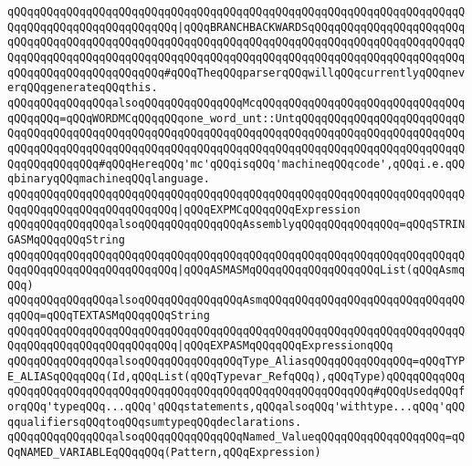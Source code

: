 \verb|qQQqqQQqqQQqqQQqqQQqqQQqqQQqqQQqqQQqqQQqqQQqqQQqqQQqqQQqqQQqqQQqqQQqqQQqqQQqqQQqqQQqqQQqqQQqqQQq|\verb#|qQQqBRANCHBACKWARDSqQQqqQQqqQQqqQQqqQQqqQQqqQQqqQQqqQQqqQQqqQQqqQQqqQQqqQQqqQQqqQQqqQQqqQQqqQQqqQQqqQQqqQQqqQQqqQQqqQQqqQQqqQQqqQQqqQQqqQQqqQQqqQQqqQQqqQQqqQQqqQQqqQQqqQQqqQQqqQQqqQQqqQQqqQQqqQQqqQQqqQQqqQQq#\verb|#qQQqTheqQQqparserqQQqwillqQQqcurrentlyqQQqneverqQQqgenerateqQQqthis.|\newline
\newline
\verb|qQQqqQQqqQQqqQQqalsoqQQqqQQqqQQqqQQqMcqQQqqQQqqQQqqQQqqQQqqQQqqQQqqQQqqQQqqQQq=qQQqWORDMCqQQqqQQqone_word_unt::UntqQQqqQQqqQQqqQQqqQQqqQQqqQQqqQQqqQQqqQQqqQQqqQQqqQQqqQQqqQQqqQQqqQQqqQQqqQQqqQQqqQQqqQQqqQQqqQQqqQQqqQQqqQQqqQQqqQQqqQQqqQQqqQQqqQQqqQQqqQQqqQQqqQQqqQQqqQQqqQQqqQQqqQQqqQQqqQQqqQQq#qQQqHereqQQq'mc'qQQqisqQQq'machineqQQqcode',qQQqi.e.qQQqbinaryqQQqmachineqQQqlanguage.|\newline
\verb|qQQqqQQqqQQqqQQqqQQqqQQqqQQqqQQqqQQqqQQqqQQqqQQqqQQqqQQqqQQqqQQqqQQqqQQqqQQqqQQqqQQqqQQqqQQqqQQq|\verb#|qQQqEXPMCqQQqqQQqExpression#\newline
\newline
\verb|qQQqqQQqqQQqqQQqalsoqQQqqQQqqQQqqQQqAssemblyqQQqqQQqqQQqqQQq=qQQqSTRINGASMqQQqqQQqString|\newline
\verb|qQQqqQQqqQQqqQQqqQQqqQQqqQQqqQQqqQQqqQQqqQQqqQQqqQQqqQQqqQQqqQQqqQQqqQQqqQQqqQQqqQQqqQQqqQQqqQQq|\verb#|qQQqASMASMqQQqqQQqqQQqqQQqqQQqList(qQQqAsmqQQq)#\newline
\newline
\verb|qQQqqQQqqQQqqQQqalsoqQQqqQQqqQQqqQQqAsmqQQqqQQqqQQqqQQqqQQqqQQqqQQqqQQqqQQq=qQQqTEXTASMqQQqqQQqString|\newline
\verb|qQQqqQQqqQQqqQQqqQQqqQQqqQQqqQQqqQQqqQQqqQQqqQQqqQQqqQQqqQQqqQQqqQQqqQQqqQQqqQQqqQQqqQQqqQQqqQQq|\verb#|qQQqEXPASMqQQqqQQqExpressionqQQq#\newline
\newline
\verb|qQQqqQQqqQQqqQQqalsoqQQqqQQqqQQqqQQqType_AliasqQQqqQQqqQQqqQQq=qQQqTYPE_ALIASqQQqqQQq(Id,qQQqList(qQQqTypevar_RefqQQq),qQQqType)qQQqqQQqqQQqqQQqqQQqqQQqqQQqqQQqqQQqqQQqqQQqqQQqqQQqqQQqqQQqqQQqqQQq#qQQqUsedqQQqforqQQq'typeqQQq...qQQq'qQQqstatements,qQQqalsoqQQq'withtype...qQQq'qQQqqualifiersqQQqtoqQQqsumtypeqQQqdeclarations.|\newline
\newline
\verb|qQQqqQQqqQQqqQQqalsoqQQqqQQqqQQqqQQqNamed_ValueqQQqqQQqqQQqqQQqqQQq=qQQqNAMED_VARIABLEqQQqqQQq(Pattern,qQQqExpression)|\newline
\newline
